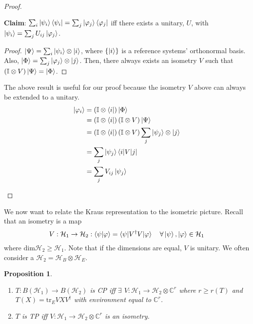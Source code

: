 \documentclass[10pt,oneside,longbibliography]{report}
\newtheorem{proposition}{Proposition}[section]
\begin{document}
\begin{tcolorbox}[colframe=black,breakable, colback=black!5, arc=0pt, outer arc=0pt,boxrule=0.5pt]
\begin{proof}
\begin{enumerate}
    \textbf{Claim}: $\sum_i \ket{\psi_i}\bra{\psi_i} = \sum_j \ket{\varphi_j} \bra{\varphi_j}$ iff there exists a unitary, $U$, with $\ket{\psi_i} = \sum_j U_{ij} \ket{\varphi_j}$.
    
    \begin{proof}
    $\ket{\Psi}=\sum_i \ket{\psi_i} \otimes \ket{i}$, where $\{\ket{i}\}$ is a reference systems' orthonormal basis. Also, $\ket{\Phi}=\sum_j \ket{\varphi_j} \otimes \ket{j}$. Then, there always exists an isometry $V$ such that $(\mathbb{I}\otimes V) \ket{\Psi} = \ket{\Phi}$.
    \end{proof}
    The above result is useful for our proof because the isometry $V$ above can always be extended to a unitary.
    \begin{align}
        \ket{\varphi_i}&= \left(\mathbb{I} \otimes \bra{i}\right)\ket{\Phi} \\
        &= \left(\mathbb{I}\otimes \bra{i}\right)(\mathbb{I}\otimes V)\ket{\Psi} \\
        &= \left(\mathbb{I}\otimes \bra{i}\right)(\mathbb{I}\otimes V)\sum_j \ket{\psi_j} \otimes \ket{j}\\
        &= \sum_j \ket{\psi_j} \bra{i|V|j}\\
        &= \sum_j V_{ij} \ket{\psi_j}
    \end{align}
\end{enumerate}
\end{proof}
\end{tcolorbox}

We now want to relate the Kraus representation to the isometric picture. Recall that an isometry is a map
\begin{align}
    V: \mathcal{H}_1 \rightarrow \mathcal{H}_2 : \braket{\psi|\varphi} = \braket{\psi|V^{\dagger}V|\varphi} \quad \forall \ket{\psi}, \ket{\varphi} \in \mathcal{H}_1
\end{align}
where $\text{dim} \mathcal{H}_2 \geq \mathcal{H}_1$. Note that if the dimensions are equal, $V$ is unitary. We often consider a $\mathcal{H}_2 = \mathcal{H}_B \otimes \mathcal{H}_E$. 

\begin{proposition}
\begin{enumerate}
    \item $T: B(\mathcal{H}_1)\rightarrow B(\mathcal{H}_2)$  is CP iff $\exists$ $V: \mathcal{H}_1 \rightarrow \mathcal{H}_2 \otimes \mathbb{C}^r$ where $r \geq r(T)$ and $T(X) =\text{tr}_E VXV^{\dagger}$ with environment equal to $\mathbb{C}^r$.
    \item $T$ is TP iff $V: \mathcal{H}_1\rightarrow \mathcal{H}_2 \otimes \mathbb{C}^r$ is an isometry.
\end{enumerate}
\end{proposition}
\end{document}

